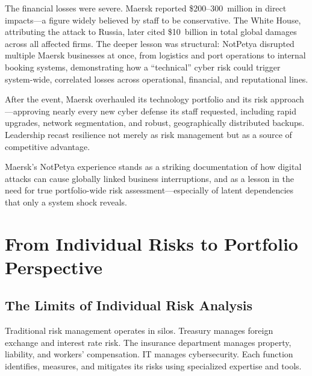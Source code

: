 \documentclass[11pt,openany]{book}
\begin{document}
\begin{corporateexample}
The financial losses were severe. Maersk reported \$200--300~million in direct
impacts---a figure widely believed by staff to be conservative. The White
House, attributing the attack to Russia, later cited \$10~billion in total
global damages across all affected firms. The deeper lesson was structural:
NotPetya disrupted multiple Maersk businesses at once, from logistics and port
operations to internal booking systems, demonstrating how a ``technical''
cyber risk could trigger system-wide, correlated losses across operational,
financial, and reputational lines.

After the event, Maersk overhauled its technology portfolio and its risk
approach---approving nearly every new cyber defense its staff requested,
including rapid upgrades, network segmentation, and robust, geographically
distributed backups. Leadership recast resilience not merely as risk
management but as a source of competitive advantage.

Maersk's NotPetya experience stands as a striking documentation of how digital
attacks can cause globally linked business interruptions, and as a lesson in
the need for true portfolio-wide risk assessment---especially of latent
dependencies that only a system shock reveals.


\end{corporateexample}

\section{From Individual Risks to Portfolio Perspective}
\label{sec:portfolio-perspective}

\subsection{The Limits of Individual Risk Analysis}
\label{subsec:limits-individual}

Traditional risk management operates in silos. Treasury manages foreign
exchange and interest rate risk. The insurance department manages property,
liability, and workers' compensation. IT manages cybersecurity. Each function
identifies, measures, and mitigates its risks using specialized expertise and
tools.
\end{document}
